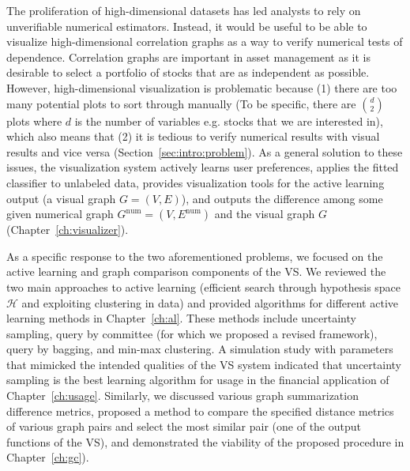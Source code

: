 The proliferation of high-dimensional datasets has led analysts to rely on 
unverifiable numerical estimators. Instead, it would be useful to be able to 
visualize high-dimensional correlation graphs as a way to verify numerical 
tests of dependence. Correlation graphs are important in asset management as it 
is desirable to select a portfolio of stocks that are as independent as 
possible. However, high-dimensional visualization is problematic because 
(1) there are too many potential plots to sort through manually (To be 
specific, there are $d\choose 2$  plots where $d$ is the number of variables 
e.g. stocks that we are interested in), which also means that (2) it is tedious 
to verify numerical results with visual results and vice versa 
(Section~\ref{sec:intro:problem}). As a general solution to these issues, the 
visualization system actively learns user preferences, applies 
the fitted classifier to unlabeled data, provides visualization tools for the 
active learning output (a visual graph $G=(V,E)$), and outputs the difference 
among some given numerical graph $G^{\text{num}}=(V,E^{\text{num}})$ and the 
visual graph $G$ (Chapter~\ref{ch:visualizer}).

As a specific response to the two aforementioned problems, we focused on the 
active learning and graph comparison components of the VS. We reviewed the two 
main approaches to active learning (efficient search through hypothesis space 
$\mathcal{H}$ and exploiting clustering in data) and provided algorithms for 
different active learning methods in Chapter~\ref{ch:al}. These methods include 
uncertainty sampling, query by committee (for which we proposed a revised 
framework), query by bagging, and min-max clustering. A simulation study 
with parameters that mimicked the intended qualities of the VS system
indicated that uncertainty sampling is the best learning algorithm for usage in 
the financial application of Chapter~\ref{ch:usage}. Similarly, we discussed 
various graph summarization difference metrics, proposed a method to compare 
the specified distance metrics of various graph pairs and select the most 
similar pair (one of the output functions of the VS), and demonstrated the 
viability of the proposed procedure in Chapter~\ref{ch:gc}). 

